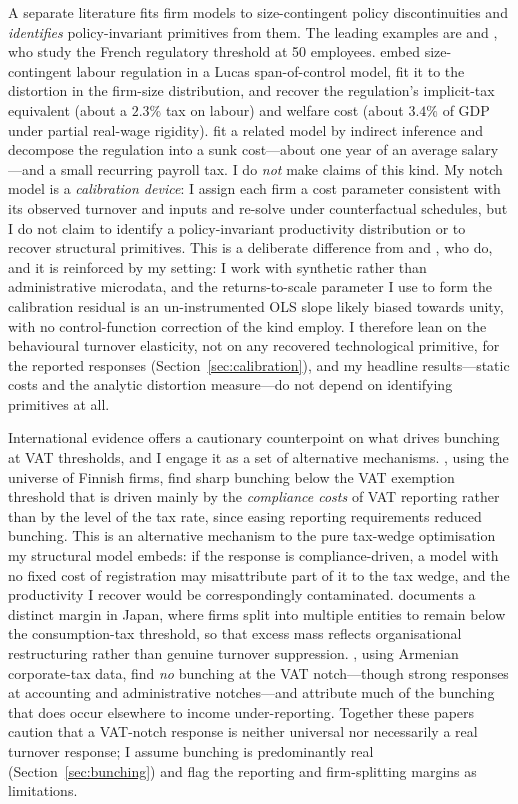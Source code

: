 A separate literature fits firm models to size-contingent policy discontinuities and
\emph{identifies} policy-invariant primitives from them. The leading examples are
\citet{garicano2016} and \citet{gourioroys2014}, who study the French regulatory
threshold at 50 employees. \citet{garicano2016} embed size-contingent labour regulation
in a Lucas span-of-control model, fit it to the distortion in the firm-size distribution,
and recover the regulation's implicit-tax equivalent (about a $2.3\%$ tax on labour) and
welfare cost (about $3.4\%$ of GDP under partial real-wage rigidity).
\citet{gourioroys2014} fit a related model by indirect inference and decompose the
regulation into a sunk cost---about one year of an average salary---and a small recurring
payroll tax. I do \emph{not} make claims of this kind. My notch model is a
\emph{calibration device}: I assign each firm a cost parameter consistent with its
observed turnover and inputs and re-solve under counterfactual schedules, but I do not
claim to identify a policy-invariant productivity distribution or to recover structural
primitives. This is a deliberate difference from \citet{garicano2016} and
\citet{gourioroys2014}, who do, and it is reinforced by my setting: I work with
synthetic rather than administrative microdata, and the returns-to-scale parameter I use
to form the calibration residual is an un-instrumented OLS slope likely biased towards
unity, with no control-function correction of the kind \citet{garicano2016} employ. I
therefore lean on the behavioural turnover elasticity, not on any recovered technological
primitive, for the reported responses (Section~\ref{sec:calibration}), and my headline
results---static costs and the analytic distortion measure---do not depend on identifying
primitives at all.

International evidence offers a cautionary counterpoint on what drives bunching at VAT
thresholds, and I engage it as a set of alternative mechanisms. \citet{harju2019}, using
the universe of Finnish firms, find sharp bunching below the VAT exemption threshold that
is driven mainly by the \emph{compliance costs} of VAT reporting rather than by the level
of the tax rate, since easing reporting requirements reduced bunching. This is an
alternative mechanism to the pure tax-wedge optimisation my structural model embeds: if
the response is compliance-driven, a model with no fixed cost of registration may
misattribute part of it to the tax wedge, and the productivity I recover would be
correspondingly contaminated. \citet{onji2009} documents a distinct margin in Japan,
where firms split into multiple entities to remain below the consumption-tax threshold,
so that excess mass reflects organisational restructuring rather than genuine turnover
suppression. \citet{asatryanpeichl2017}, using Armenian corporate-tax data, find
\emph{no} bunching at the VAT notch---though strong responses at accounting and
administrative notches---and attribute much of the bunching that does occur elsewhere to
income under-reporting. Together these papers caution that a VAT-notch response is neither
universal nor necessarily a real turnover response; I assume bunching is predominantly
real (Section~\ref{sec:bunching}) and flag the reporting and firm-splitting margins as
limitations.

